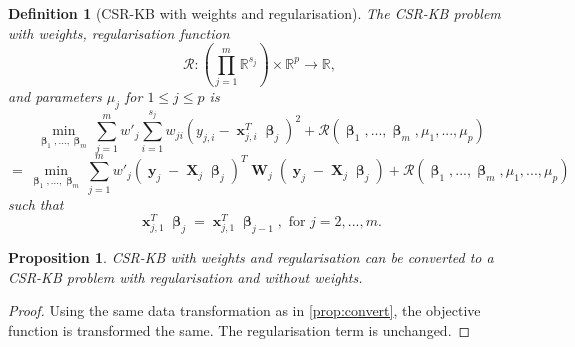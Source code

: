 \documentclass[12pt]{article}
\DeclareMathOperator{\bx}{\textbf{x}}
\DeclareMathOperator{\bX}{\textbf{X}}
\DeclareMathOperator{\by}{\textbf{y}}
\DeclareMathOperator{\bW}{\textbf{W}}
\DeclareMathOperator{\bbeta}{\boldsymbol{\beta}}
\newtheorem{defn}{Definition}
\newtheorem{prop}{Proposition}
\begin{document}
\begin{defn}[CSR-KB with weights and regularisation]
The CSR-KB problem with weights, regularisation function 
$$\mathcal{R} : \left(\prod_{j=1}^m \mathbb{R}^{s_j} \right) \times \mathbb{R}^p \to \mathbb{R},$$
and parameters $\mu_j$ for $1 \leq j \leq p$ is
$$\min_{\bbeta_1,...,\bbeta_m} \sum_{j=1}^m w'_j\sum_{i=1}^{s_j} w_{ji}(y_{j, i}-\bx_{j, i}^T\bbeta_j)^2+\mathcal{R}(\bbeta_1, ..., \bbeta_m, \mu_1, ..., \mu_p)$$
$$= \min_{\bbeta_1,...,\bbeta_m} \sum_{j=1}^m w'_j (\by_j-\bX_j\bbeta_j)^T\bW_j(\by_j-\bX_j\bbeta_j)+\mathcal{R}(\bbeta_1, ..., \bbeta_m, \mu_1, ..., \mu_p)$$
such that
$$\bx_{j, 1}^T \bbeta_j = \bx_{j, 1}^T \bbeta_{j-1}, \text{ for }j=2, ..., m.$$
\end{defn}
\begin{prop}
CSR-KB with weights and regularisation can be converted to a CSR-KB problem with regularisation and without weights.
\end{prop}
\begin{proof}
Using the same data transformation as in \ref{prop:convert}, the objective function is transformed the same. The regularisation term is unchanged.
\end{proof}
\end{document}
